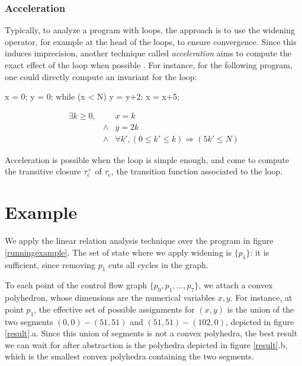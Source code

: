 \documentclass[a4paper,english,titlepage,11pt]{report}
\begin{document}
\subsubsection{Acceleration}

Typically, to analyze a program with loops, the approach is to use the
widening operator, for example at the head of the loops, to ensure convergence.
Since this induces imprecision, another technique called \emph{acceleration}
aims to compute the exact effect of the loop when possible \cite{Gon07,GH06}. For instance, for
the following program, one could directly compute an invariant for the loop:


\begin{minipage}[c]{.39\linewidth}
\begin{C}
x = 0;
y = 0;
while (x < N) {
	y = y+2;
	x = x+5;
}
\end{C}
\end{minipage} 
\begin{minipage}[c]{.59\linewidth}
$$\begin{array}{llll}
\exists k \geq 0,& & x  = k \\
		&\wedge & y = 2k \\
		&\wedge & \forall k', (0 \leq k' \leq k)
				\Rightarrow (5k' \leq N)
\end{array}$$
\end{minipage}

Acceleration is possible when the loop is simple enough, and come to compute the
transitive closure $\tau_e^+$ of $\tau_e$, the transition function associated to
the loop.

\section{Example}

We apply the linear relation analysis technique over the program in figure
\ref{runningexample}. The set of state where we apply widening is $\{p_1\}$: it
is sufficient, since removing $p_1$ cuts all cycles in the graph.

To each point of the control flow graph $\{p_0, p_1,\dots, p_7\}$, we attach a
convex polyhedron, whose dimensions are the numerical variables $x,y$.
For instance, at point $p_1$, the effective set of possible assignments for
$(x,y)$ is the union of the two segments $(0,0) - (51,51)$ and $(51,51) -
(102,0)$, depicted in figure \ref{result}.a. Since this union of segments is not
a convex polyhedra, the best result we can wait for after abstraction is the
polyhedra depicted in figure \ref{result}.b, which is the smallest convex
polyhedra containing the two segments.
\end{document}
